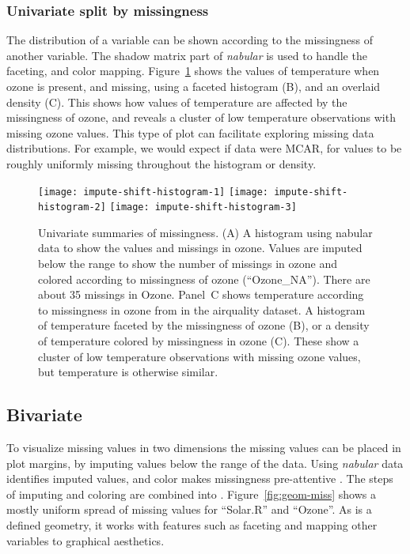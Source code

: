 \documentclass[article]{jss}
\begin{document}
\subsubsection{Univariate split by missingness}

The distribution of a variable
can be shown according to the missingness of another variable.  The shadow
matrix part of \emph{nabular} is used to handle the faceting, and color
mapping.  Figure~\ref{fig:impute-shift-histogram} shows the values of
temperature when ozone is present, and missing, using a faceted histogram
(B), and an overlaid density (C).  This shows how values of temperature are
affected by the missingness of ozone, and reveals a cluster of low
temperature observations with missing ozone values.  This type of plot can
facilitate exploring missing data distributions.  For example, we would
expect if data were MCAR, for values to be roughly uniformly missing
throughout the histogram or density.

\begin{figure}[t!]
\centering
\texttt{[image: impute-shift-histogram-1]}
\texttt{[image: impute-shift-histogram-2]}
\texttt{[image: impute-shift-histogram-3]}
\caption[Univariate summaries of missingness]{Univariate summaries of
missingness.  (A) A histogram using nabular data to show the values and
missings in ozone.  Values are imputed below the range to show the number of
missings in ozone and colored according to missingness of ozone
(``Ozone\_NA'').  There are about 35 missings in Ozone.  Panel~C shows
temperature according to missingness in ozone from in the airquality
dataset.  A histogram of temperature faceted by the missingness of ozone
(B), or a density of temperature colored by missingness in ozone (C).  These
show a cluster of low temperature observations with missing ozone values,
but temperature is otherwise similar.}\label{fig:impute-shift-histogram}
\end{figure}

\hypertarget{bivariate}{%
\subsection{Bivariate}\label{bivariate}}

To visualize missing values in two dimensions the missing values can be
placed in plot margins, by imputing values below the range of the data.
Using \emph{nabular} data identifies imputed values, and color makes
missingness pre-attentive \citep{treisman1985}.  The steps of imputing and
coloring are combined into .
Figure~\ref{fig:geom-miss} shows a mostly uniform spread of missing values
for ``Solar.R'' and ``Ozone''.  As  is a defined
 geometry, it works with features such as faceting and mapping
other variables to graphical aesthetics.
\end{document}

